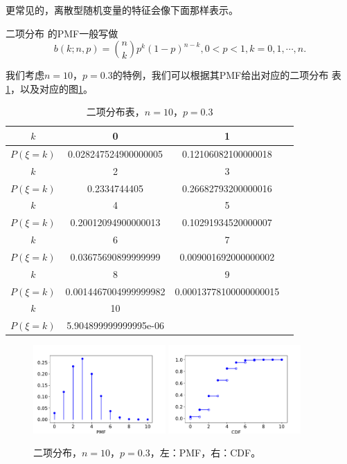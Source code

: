 更常见的，离散型随机变量的特征会像下面那样表示。

\begin{example} {\hei 二项分布} 的PMF一般写做
\begin{equation}
  b(k; n, p) = \binom{n}{k}p^k(1 - p)^{n - k}, 0 < p < 1, k = 0, 1, \cdots, n.
  \label{eq::binom_PMF}
\end{equation}
\label{example::binom}
\end{example}

我们考虑$n = 10$，$p = 0.3$的特例，我们可以根据其PMF给出对应的二项分布
表\ref{table::df_bin}，以及对应的图\ref{fig::DF_bin}。

\begin{table}[!ht]
  \centering
  \caption{二项分布表，$n = 10$，$p = 0.3$}
  \label{table::df_bin}
\begin{tabular}{|c|c|c|c|}
  \hline
  $k$&0&1\\
  \hline
  $P(\xi = k)$&0.028247524900000005&0.12106082100000018\\
  \hline
  $k$&2&3\\
  \hline
  $P(\xi = k)$&0.2334744405&0.26682793200000016\\
  \hline
   $k$&4&5\\
   \hline
   $P(\xi = k)$&0.20012094900000013&0.10291934520000007\\
   \hline
   $k$&6&7\\
   \hline
   $P(\xi = k)$&0.03675690899999999&0.009001692000000002\\
   \hline
   $k$&8&9\\
   \hline
   $P(\xi = k)$&0.0014467004999999982&0.00013778100000000015\\
   \hline
   $k$&10&\\
   \hline
   $P(\xi = k)$&5.904899999999995e-06& \\
   \hline
\end{tabular}
\end{table}

\begin{figure}[!ht]
\centering
\includegraphics[width=0.45\textwidth]{images/PMF_bin.pdf}
\includegraphics[width=0.45\textwidth]{images/CDF_bin.pdf}
\caption{二项分布，$n = 10$，$p = 0.3$，左：PMF，右：CDF。}
\label{fig::DF_bin}
\end{figure}

